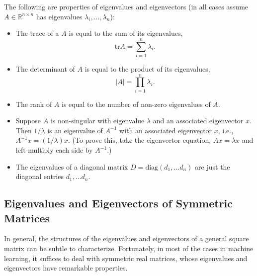 \documentclass[12pt]{article}
\begin{document}
The following are properties of
eigenvalues and eigenvectors (in all cases assume $A \in \mathbb{R}^{n
  \times n}$ has eigenvalues $\lambda_i, \ldots, \lambda_n$):
\begin{itemize}
\item The trace of a $A$ is equal to the sum of its eigenvalues,
\[\mathrm{tr}A = \sum_{i=1}^n \lambda_i.\]
\item The determinant of $A$ is equal to the product of its
  eigenvalues,
\[|A| = \prod_{i=1}^n \lambda_i.\]
\item The rank of $A$ is equal to the number of non-zero eigenvalues
  of $A$.
\item Suppose $A$ is non-singular with eigenvalue $\lambda$ and an associated eigenvector $x$. Then $1/\lambda$ is an eigenvalue of
  $A^{-1}$ with an associated eigenvector $x$, i.e., $A^{-1}x =
  (1/\lambda)x$.  (To prove this, take the eigenvector equation,
  $A x = \lambda x$ and left-multiply each side by $A^{-1}$.)
\item The eigenvalues of a diagonal matrix $D = \mathrm{diag}(d_1,
  \ldots d_n)$ are just the diagonal entries $d_1, \ldots d_n$.
\end{itemize}


\subsection{Eigenvalues and Eigenvectors of Symmetric Matrices}


In general, the structures of the eigenvalues and eigenvectors of a general square matrix can be subtle to characterize. Fortunately, in most of the cases in machine learning, it suffices to deal with symmetric real matrices, whose eigenvalues and eigenvectors have remarkable properties. 
\end{document}
